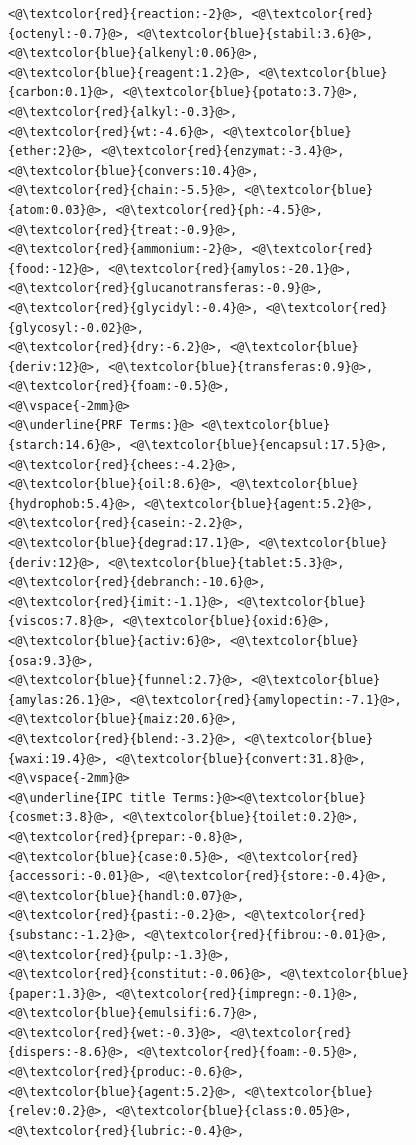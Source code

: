 \begin{figure}[t!]
\begin{framed}
\begin{lstlisting}[basicstyle=\scriptsize\ttfamily , linewidth=\columnwidth,breaklines=true]
<@\textcolor{red}{reaction:-2}@>, <@\textcolor{red}{octenyl:-0.7}@>, <@\textcolor{blue}{stabil:3.6}@>, <@\textcolor{blue}{alkenyl:0.06}@>, 
<@\textcolor{blue}{reagent:1.2}@>, <@\textcolor{blue}{carbon:0.1}@>, <@\textcolor{blue}{potato:3.7}@>, <@\textcolor{red}{alkyl:-0.3}@>, 
<@\textcolor{red}{wt:-4.6}@>, <@\textcolor{blue}{ether:2}@>, <@\textcolor{red}{enzymat:-3.4}@>, <@\textcolor{blue}{convers:10.4}@>, 
<@\textcolor{red}{chain:-5.5}@>, <@\textcolor{blue}{atom:0.03}@>, <@\textcolor{red}{ph:-4.5}@>, <@\textcolor{red}{treat:-0.9}@>, 
<@\textcolor{red}{ammonium:-2}@>, <@\textcolor{red}{food:-12}@>, <@\textcolor{red}{amylos:-20.1}@>, 
<@\textcolor{red}{glucanotransferas:-0.9}@>, <@\textcolor{red}{glycidyl:-0.4}@>, <@\textcolor{red}{glycosyl:-0.02}@>, 
<@\textcolor{red}{dry:-6.2}@>, <@\textcolor{blue}{deriv:12}@>, <@\textcolor{blue}{transferas:0.9}@>, <@\textcolor{red}{foam:-0.5}@>, 
<@\vspace{-2mm}@>
<@\underline{PRF Terms:}@> <@\textcolor{blue}{starch:14.6}@>, <@\textcolor{blue}{encapsul:17.5}@>, <@\textcolor{red}{chees:-4.2}@>, 
<@\textcolor{blue}{oil:8.6}@>, <@\textcolor{blue}{hydrophob:5.4}@>, <@\textcolor{blue}{agent:5.2}@>, <@\textcolor{red}{casein:-2.2}@>, 
<@\textcolor{blue}{degrad:17.1}@>, <@\textcolor{blue}{deriv:12}@>, <@\textcolor{blue}{tablet:5.3}@>, <@\textcolor{red}{debranch:-10.6}@>, 
<@\textcolor{red}{imit:-1.1}@>, <@\textcolor{blue}{viscos:7.8}@>, <@\textcolor{blue}{oxid:6}@>, <@\textcolor{blue}{activ:6}@>, <@\textcolor{blue}{osa:9.3}@>, 
<@\textcolor{blue}{funnel:2.7}@>, <@\textcolor{blue}{amylas:26.1}@>, <@\textcolor{red}{amylopectin:-7.1}@>, <@\textcolor{blue}{maiz:20.6}@>, 
<@\textcolor{red}{blend:-3.2}@>, <@\textcolor{blue}{waxi:19.4}@>, <@\textcolor{blue}{convert:31.8}@>, 
<@\vspace{-2mm}@>
<@\underline{IPC title Terms:}@><@\textcolor{blue}{cosmet:3.8}@>, <@\textcolor{blue}{toilet:0.2}@>, <@\textcolor{red}{prepar:-0.8}@>, 
<@\textcolor{blue}{case:0.5}@>, <@\textcolor{red}{accessori:-0.01}@>, <@\textcolor{red}{store:-0.4}@>, <@\textcolor{blue}{handl:0.07}@>, 
<@\textcolor{red}{pasti:-0.2}@>, <@\textcolor{red}{substanc:-1.2}@>, <@\textcolor{red}{fibrou:-0.01}@>, <@\textcolor{red}{pulp:-1.3}@>, 
<@\textcolor{red}{constitut:-0.06}@>, <@\textcolor{blue}{paper:1.3}@>, <@\textcolor{red}{impregn:-0.1}@>, <@\textcolor{blue}{emulsifi:6.7}@>, 
<@\textcolor{red}{wet:-0.3}@>, <@\textcolor{red}{dispers:-8.6}@>, <@\textcolor{red}{foam:-0.5}@>, <@\textcolor{red}{produc:-0.6}@>, 
<@\textcolor{blue}{agent:5.2}@>, <@\textcolor{blue}{relev:0.2}@>, <@\textcolor{blue}{class:0.05}@>, <@\textcolor{red}{lubric:-0.4}@>, 

\end{lstlisting}
\end{framed}
\end{figure}
